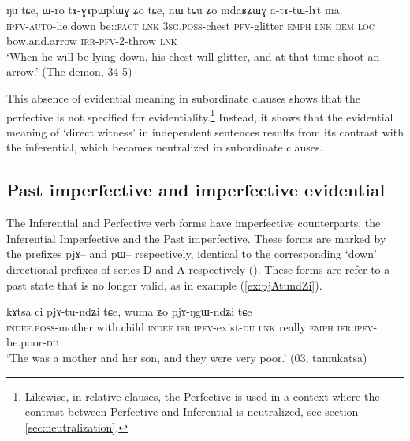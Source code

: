 \documentclass[oldfontcommands,oneside,a4paper,11pt]{article}
\newcommand{\ipa}[1]{{\phon \mbox{#1}}} %
\newcommand{\refb}[1]{(\ref{#1})}
\newcommand{\factual}[1]{\textsc{:fact}}
\begin{document}
\begin{exe}
\ex \label{ex:tAGApWplWG}
\gll \ipa{ku-nɯ-rŋgɯ} 	\ipa{ŋu} 	\ipa{tɕe,} 	\ipa{ɯ-ro} 	\ipa{tɤ-ɣɤpɯplɯɣ} 	\ipa{ʑo} 	\ipa{tɕe,} 	\ipa{nɯ} 	\ipa{tɕu} 	\ipa{ʑo} 	\ipa{mdaʁʑɯɣ} 	\ipa{a-tɤ-tɯ-lɤt} 	\ipa{ma}  \\
\textsc{ipfv-auto}-lie.down be:\factual{} \textsc{lnk} \textsc{3sg.poss}-chest \textsc{pfv}-glitter \textsc{emph} \textsc{lnk} \textsc{dem} \textsc{loc} bow.and.arrow \textsc{irr-pfv}-2-throw \textsc{lnk} \\
\glt `When he will be lying down, his chest will glitter, and at that time shoot an arrow.' (The demon, 34-5)
\end{exe}


This absence of evidential meaning in subordinate clauses shows that the perfective is not specified for evidentiality.\footnote{Likewise, in relative clauses, the Perfective is used in a context where the contrast between Perfective and Inferential is neutralized, see section \ref{sec:neutralization}.} Instead, it shows that the evidential meaning of `direct witness' in independent sentences results from its contrast with the inferential, which becomes neutralized in subordinate clauses.


\subsection{Past imperfective and imperfective evidential}  \label{sec:pst:ipfv}
The Inferential and Perfective verb forms have imperfective counterparts, the Inferential Imperfective and the  Past imperfective. These forms are marked by the prefixes \ipa{pjɤ--} and \ipa{pɯ--} respectively, identical to the 
corresponding `down' directional prefixes of series D and A respectively (\citealt{lin11direction}). These forms are refer to a past state that is no longer valid, as in example \refb{ex:pjAtundZi}. 

\begin{exe}
\ex \label{ex:pjAtundZi}
\gll  \ipa{tɤ-mu} 	\ipa{kɤtsa} 	\ipa{ci} 	\ipa{pjɤ-tu-ndʑi} 	\ipa{tɕe,} 	\ipa{wuma} 	\ipa{ʑo} 	\ipa{pjɤ-ŋgɯ-ndʑi} 	\ipa{tɕe}  \\
\textsc{indef.poss}-mother with.child \textsc{indef} \textsc{ifr:ipfv}-exist-\textsc{du} \textsc{lnk} really \textsc{emph}  \textsc{ifr:ipfv}-be.poor-\textsc{du} \\
\glt `The was a mother and her son, and they were very poor.' (03, tamukatsa)
\end{exe}
\end{document}
